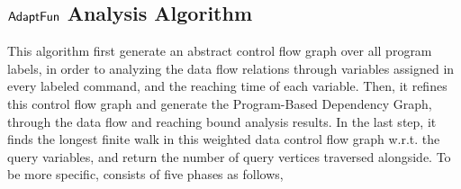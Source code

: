 \subsection{ $\textsf{AdaptFun}$ Analysis Algorithm}
This algorithm first 
 generate an abstract control flow graph
 over all program labels, 
in order to analyzing the data flow relations through variables assigned in every labeled command,
and the reaching time of each variable.
Then, it refines this control flow graph 
and generate the Program-Based Dependency Graph,
through the data flow and reaching bound analysis results.
In the last step, it finds the longest finite walk in this weighted data control flow graph w.r.t. the query variables,
and return the number of query vertices traversed alongside.
To be more specific, {\THESYSTEM} consists of five phases as follows,
\\
